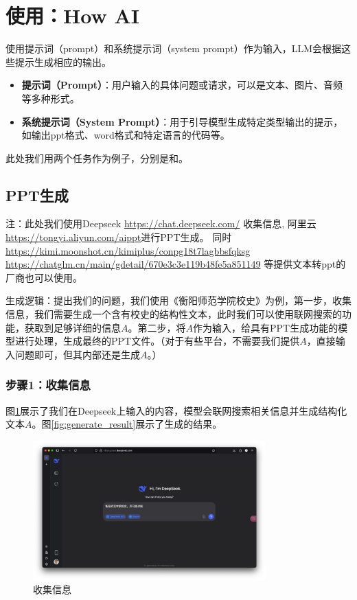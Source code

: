 \documentclass{article}
\begin{document}
\newpage
\section{使用：How AI}

 使用提示词（prompt）和系统提示词（system prompt）作为输入，LLM会根据这些提示生成相应的输出。

\begin{itemize}
  \item \textbf{提示词（Prompt）}：用户输入的具体问题或请求，可以是文本、图片、音频等多种形式。
  \item \textbf{系统提示词（System Prompt）}：用于引导模型生成特定类型输出的提示，如输出ppt格式、word格式和特定语言的代码等。
\end{itemize}

此处我们用两个任务作为例子，分别是和。

\subsection{PPT生成}

\noindent 注：此处我们使用Deepseek \url{https://chat.deepseek.com/} 收集信息, 阿里云 \url{https://tongyi.aliyun.com/aippt}进行PPT生成。  同时 \url{https://kimi.moonshot.cn/kimiplus/conpg18t7lagbbsfqksg}  \url{https://chatglm.cn/main/gdetail/670e3c3e119b48fe5a851149} 等提供文本转ppt的厂商也可以使用。

生成逻辑：提出我们的问题，我们使用《衡阳师范学院校史》为例，第一步，收集信息，我们需要生成一个含有校史的结构性文本，此时我们可以使用联网搜索的功能，获取到足够详细的信息$A$。第二步，将$A$作为输入，给具有PPT生成功能的模型进行处理，生成最终的PPT文件。（对于有些平台，不需要我们提供$A$，直接输入问题即可，但其内部还是生成$A$。）

\subsubsection{步骤1：收集信息}

图\ref{fig:collect_info}展示了我们在Deepseek上输入的内容，模型会联网搜索相关信息并生成结构化文本$A$。图\ref{fig:generate_result}展示了生成的结果。
\begin{figure}[htbp]
  \centering
  \includegraphics[width=0.8\textwidth]{./fig/search.png}
  \caption{收集信息}
  \label{fig:collect_info}
\end{figure}
\end{document}
